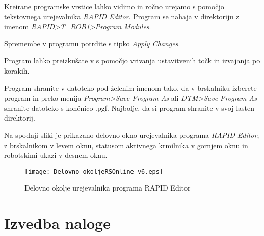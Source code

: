 Kreirane programske vrstice lahko vidimo in ročno urejamo s pomočjo
tekstovnega urejevalnika  \emph{RAPID Editor}. Program se nahaja v direktoriju z
imenom \emph{RAPID>T\_ROB1>Program Modules}.


\vspace{0.3cm} \noindent Spremembe v programu potrdite s tipko
\emph{Apply Changes}.

\vspace{0.3cm} \noindent Program lahko preizkušate v s pomočjo
vrivanja ustavitvenih točk in izvajanja po korakih.


\vspace{0.3cm} \noindent Program shranite v datoteko pod želenim
imenom tako, da v brskalniku izberete program in preko menija
\emph{Program>Save Program As} ali \emph{DTM>Save Program As}
shranite datoteko s končnico .pgf. Najbolje, da si program
shranite v svoj lasten direktorij.

\vspace{0.3cm} \noindent Na spodnji sliki je prikazano delovno okno
urejevalnika programa \emph{RAPID Editor}, z brskalnikom v levem
oknu, statusom aktivnega krmilnika v gornjem oknu in robotskimi ukazi
v desnem oknu.

\begin{figure}[h]
\centering
\texttt{[image: Delovno\_okoljeRSOnline\_v6.eps]}
  \caption{\label{figure2} Delovno okolje urejevalnika programa RAPID Editor}
\end{figure}



\section{Izvedba naloge}

